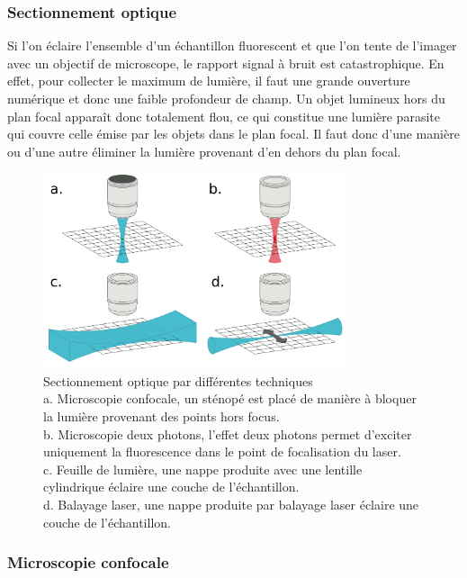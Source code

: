 \subsubsection{Sectionnement optique}

Si l'on éclaire l'ensemble d'un échantillon fluorescent et que l'on tente de l'imager avec un objectif de microscope, le rapport signal à bruit est catastrophique. En effet, pour collecter le maximum de lumière, il faut une grande ouverture numérique et donc une faible profondeur de champ. Un objet lumineux hors du plan focal apparaît donc totalement flou, ce qui constitue une lumière parasite qui couvre celle émise par les objets dans le plan focal. Il faut donc d'une manière ou d'une autre éliminer la lumière provenant d'en dehors du plan focal.

\begin{figure}
  \centering
  \includegraphics[width=0.8\textwidth]{./files/optical_sectionning.svg.png}
  \caption{Sectionnement optique par différentes techniques \\
  a. Microscopie confocale, un sténopé est placé de manière à bloquer la lumière provenant des points hors focus. \\
  b. Microscopie deux photons, l'effet deux photons permet d'exciter uniquement la fluorescence dans le point de focalisation du laser. \\
  c. Feuille de lumière, une nappe produite avec une lentille cylindrique éclaire une couche de l'échantillon. \\
  d. Balayage laser, une nappe produite par balayage laser éclaire une couche de l'échantillon. \\
  }
  \end{figure}

\subsubsection{Microscopie confocale}


